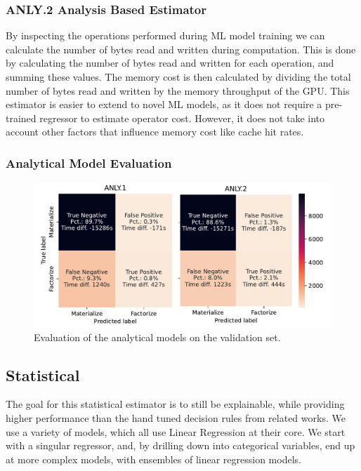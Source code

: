 
\subsubsection{ANLY.2 Analysis Based Estimator}
By inspecting the operations performed during ML model training we can calculate the number of bytes read and written during computation. This is done by calculating the number of bytes read and written for each operation, and summing these values. The memory cost is then calculated by dividing the total number of bytes read and written by the memory throughput of the GPU. This estimator is easier to extend to novel ML models, as it does not require a pre-trained regressor to estimate operator cost. However, it does not take into account other factors that influence memory cost like cache hit rates.

\subsubsection{Analytical Model Evaluation}
\begin{figure}[ht]
    \centering
    \includegraphics[width=0.9\linewidth]{chapters/05_cost_estimation/figures/analytical-models-compare.pdf}
    \caption[Analytical Model Evaluation]{Evaluation of the analytical models on the validation set. }
    \label{fig:5-analytical-model-evaluation}
\end{figure}


\subsection{Statistical}
The goal for this statistical estimator is to still be explainable, while providing higher performance than the hand tuned decision rules from related works. We use a variety of models, which all use Linear Regression at their core. We start with a singular regressor, and, by drilling down into categorical variables, end up at more complex models, with ensembles of linear regression models.

